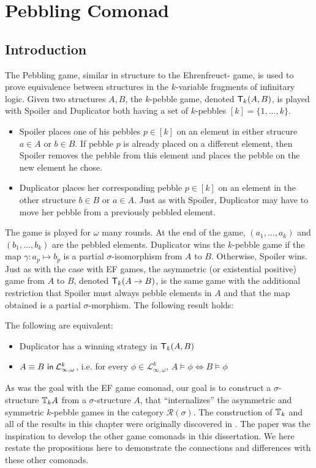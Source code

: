 \chapter{Pebbling Comonad}
\section{Introduction}
The Pebbling game, similar in structure to the Ehrenfreuct-{\Fraisse} game, is used to prove equivalence between structures in the $k$-variable fragments of infinitary logic. Given two structures $A,B$, the $k$-pebble game, denoted ${\mathsf{T}_{k}(A,B)}$, is played with Spoiler and Duplicator both having a set of $k$-pebbles $[k] = \{1,\dots,k\}$.  
\begin{itemize} 
\item Spoiler places one of his pebbles $p \in [k]$ on an element in either strucure $a \in A$ or $b \in B$. If pebble $p$ is already placed on a different element, then Spoiler removes the pebble from this element and places the pebble on the new element he chose.  
\item Duplicator places her corresponding pebble $p \in [k]$ on an element in the other structure $b \in B$ or $a \in A$. Just as with Spoiler, Duplicator may have to move her pebble from a previously pebbled element.
\end{itemize} 
The game is played for $\omega$ many rounds. At the end of the game, $(a_{1},\dots,a_{k})$ and $(b_{1},\dots,b_{k})$ are the pebbled elements. Duplicator wins the $k$-pebble game if the map $\gamma:a_{p} \longmapsto b_{p}$ is a partial $\sigma$-isomorphism from $A$ to $B$. Otherwise, Spoiler wins. Just as with the case with EF games, the asymmetric (or existential positive) game from $A$ to $B$, denoted ${\mathsf{T}_{k}(A \rightarrow B)}$, is the same game with the additional restriction that Spoiler must always pebble elements in $A$ and that the map obtained is a partial $\sigma$-morphism. The following result holds:
\begin{prop}
The following are equivalent:
\begin{itemize}
\item Duplicator has a winning strategy in ${\mathsf{T}_{k}(A,B)}$
\item ${A \equiv B \ \mathsf{in}\: \mathcal{L}^{k}_{\infty,\omega}}$, i.e. for every $\phi \in \mathcal{L}^{k}_{\infty,\omega}$, $A \vDash \phi \Leftrightarrow B \vDash \phi$
\end{itemize}
\end{prop}
As was the goal with the EF game comonad, our goal is to construct a $\sigma$-structure ${\mathbb{T}_{k}A}$ from a $\sigma$-structure $A$, that ``internalizes'' the asymmetric and symmetric $k$-pebble games in the category $\mathcal{R}(\sigma)$. The construction of ${\mathbb{T}_{k}}$ and all of the results in this chapter were originally discovered in \cite{Abramsky2017}. The paper \cite{Abramsky2017} was the inspiration to develop the other game comonads in this dissertation. We here restate the propositions here to demonstrate the connections and differences with these other comonads.  
